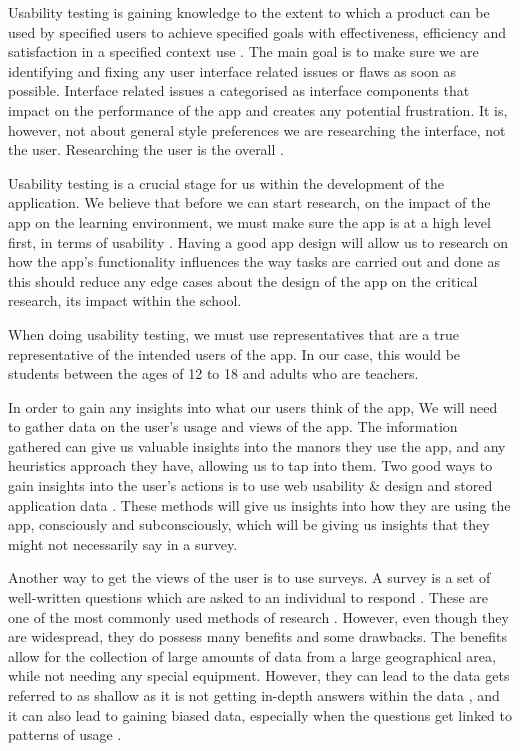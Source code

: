 \documentclass[sigchi]{acmart}
\begin{document}
Usability testing is gaining knowledge to the extent to which a product can be used by specified users to achieve specified goals with effectiveness, efficiency and satisfaction in a specified context use \cite{bevan2001proposed}. The main goal is to make sure we are identifying and fixing any user interface related issues or flaws as soon as possible. Interface related issues a categorised as interface components that impact on the performance of the app and creates any potential frustration. It is, however, not about general style preferences we are researching the interface, not the user. Researching the user is the overall  \cite{HCIusability}.  

Usability testing is a crucial stage for us within the development of the application. We believe that before we can start research, on the impact of the app on the learning environment, we must make sure the app is at a high level first, in terms of usability \cite{lazar2017research}. Having a good app design will allow us to research on how the app's functionality influences the way tasks are carried out and done as this should reduce any edge cases about the design of the app on the critical research, its impact within the school. 

When doing usability testing, we must use representatives that are a true representative of the intended users of the app. In our case, this would be students between the ages of 12 to 18 and adults who are teachers. 

In order to gain any insights into what our users think of the app, We will need to gather data on the user's usage and views of the app. The information gathered can give us valuable insights into the manors they use the app, and any heuristics approach they have, allowing us to tap into them. Two good ways to gain insights into the user's actions is to use web usability \& design and stored application data \cite{datacollectionlecture}. These methods will give us insights into how they are using the app, consciously and subconsciously, which will be giving us insights that they might not necessarily say in a survey.

Another way to get the views of the user is to use surveys. A survey is a set of well-written questions which are asked to an individual to respond \cite{surveylecture}. These are one of the most commonly used methods of research \cite{lazar2017research}. However, even though they are widespread, they do possess many benefits and some drawbacks. The benefits allow for the collection of large amounts of data from a large geographical area, while not needing any special equipment. However, they can lead to the data gets referred to as shallow as it is not getting in-depth answers within the data \cite{surveylecture}, and it can also lead to gaining biased data, especially when the questions get linked to patterns of usage \cite{lazar2017research}.
\end{document}

